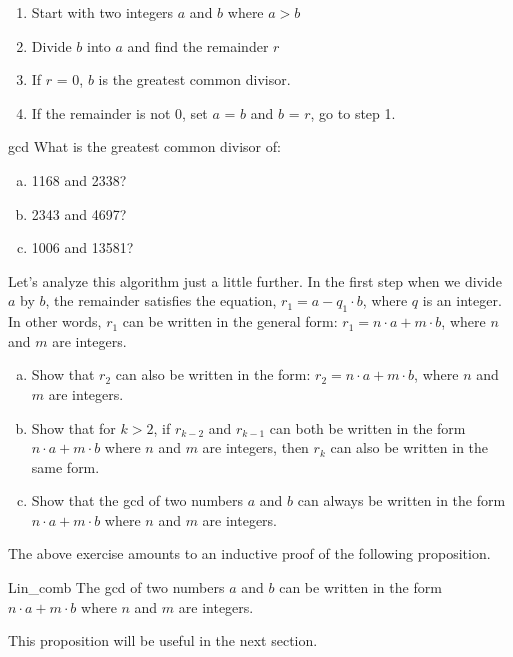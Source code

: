 \begin{enumerate}[1:]
\item
Start with two integers $a$ and $b$ where $a > b$
\item
Divide $b$ into $a$ and find the remainder $r$
\item
If $r$ = 0, $b$ is the greatest common divisor.
\item
If the remainder is not 0, set $a$ = $b$ and $b$ = $r$, go to step 1.
\end{enumerate}


\begin{exercise}{gcd}
What is the greatest common divisor of:
\begin{enumerate}[(a)]
\item
1168 and 2338?
\item
2343 and 4697?
\item
1006 and 13581?
\end{enumerate}
\end{exercise} 

Let's analyze this algorithm just a little further.  In the first step when we divide $a$ by $b$, the remainder satisfies the equation,  $r_1 = a - q_1\cdot b$, where $q$ is an integer.  In other words, $r_1$ can be written in the general form:  $r_1 = n \cdot a + m \cdot b$, where $n$ and $m$ are integers.

\begin{exercise}{71}
\begin{enumerate}[(a)]
\item  
Show that $r_2$ can also be written in the form: $r_2 = n \cdot a + m \cdot b$, where $n$ and $m$ are integers.
\item
Show that for $k>2$, if $r_{k-2}$ and $r_{k-1}$ can both be written in the form  $n \cdot a + m \cdot b$ where $n$ and $m$ are integers, then $r_k$ can also be written in the same form.
\item
Show that the gcd of two numbers $a$ and $b$ can always be written in the form $n \cdot a + m \cdot b$ where $n$ and $m$ are integers.
\end{enumerate}
\end{exercise}

The above exercise amounts to an inductive proof of the following proposition.

\begin{prop}{Lin_comb}
The gcd of two numbers $a$ and $b$ can be written in the form $n \cdot a + m \cdot b$ where $n$ and $m$ are integers.
\end{prop}
\noindent
This proposition will be useful in the next section.

